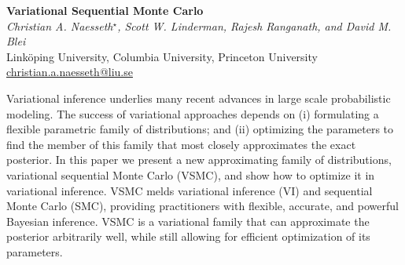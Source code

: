 \documentclass[12pt]{article}
\newcommand{\postertitle}[1]{{\Large\bf #1}\\[12pt]}
\newcommand{\authors}[1]{\emph{#1}\\}
\newcommand{\affiliations}[1]{{#1}\\}
\newcommand{\contacts}[1]{{#1}}
\begin{document}
\begin{center}
\vspace*{0.5cm}
%
\postertitle{Variational Sequential Monte Carlo}
%
\authors{Christian A. Naesseth$^\star$, Scott W. Linderman, Rajesh Ranganath, and David M. Blei} %
% 
\affiliations{Link\"oping University, Columbia University, Princeton University}
%
\contacts{\url{christian.a.naesseth@liu.se}} %
%
\vspace*{0.3cm}
\end{center}

Variational inference underlies many recent advances in large scale probabilistic modeling. The success of variational approaches depends on (i) formulating a flexible parametric family of distributions; and (ii) optimizing the parameters to find the member of this family that most closely approximates the exact posterior. In this paper we present a new approximating family of distributions, variational sequential Monte Carlo (VSMC), and show how to optimize it in variational inference. VSMC melds variational inference (VI) and sequential Monte Carlo (SMC), providing practitioners with flexible, accurate, and powerful Bayesian inference. VSMC is a variational family that can approximate the posterior arbitrarily well, while still allowing for efficient optimization of its parameters.
\end{document}
